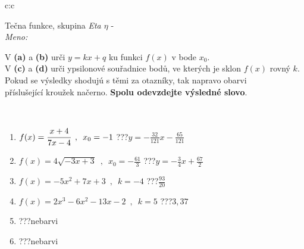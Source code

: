 \documentclass[10pt]{report}
\begin{document}
\newpage
\thispagestyle{empty}
\begin{tabular}{c:c}
\begin{minipage}[c][104.5mm][t]{0.5\linewidth}
\begin{center}
\vspace{7mm}
{\huge Tečna funkce, skupina \textit{Eta $\eta$} -}\\[5mm]
\textit{Meno:}\phantom{xxxxxxxxxxxxxxxxxxxxxxxxxxxxxxxxxxxxxxxxxxxxxxxxxxxxxxxxxxxxxxxxx}\\[5mm]
\begin{minipage}{0.95\linewidth}
\begin{center}
V \textbf{(a)} a \textbf{(b)} urči  $y = kx + q$ ku funkci $f(x)$ v bode $x_0$.\\V \textbf{(c)} a \textbf{(d)} urči ypsilonové souřadnice bodů, ve kterých je sklon $f(x)$ rovný $k$.\\Pokud se výsledky shodujú s těmi za otazníky, tak napravo obarvi\\příslušející kroužek načerno. \textbf{Spolu odevzdejte výsledné slovo}.
\end{center}
\end{minipage}
\\[1mm]
\begin{minipage}{0.79\linewidth}
\begin{center}
\begin{varwidth}{\linewidth}
\begin{enumerate}
\small
\item $f(x)=\cfrac{x+4}{7x-4}\enspace , \enspace x_0=-1$\quad \dotfill\; ???\;\dotfill \quad $y = -\frac{32}{121}x-\frac{65}{121}$
\item $f(x)=4\sqrt{-3x+3}\enspace , \enspace x_0=-\frac{61}{3}$\quad \dotfill\; ???\;\dotfill \quad $y = -\frac{3}{4}x+\frac{67}{2}$
\item $f(x)=-5x^2+7x+3\enspace , \enspace k=-4$\quad \dotfill\; ???\;\dotfill \quad $\frac{93}{20}$
\item $f(x)=2x^3-6x^2-13x-2\enspace , \enspace k=5$\quad \dotfill\; ???\;\dotfill \quad $3 , 37$
\item \quad \dotfill\; ???\;\dotfill \quad nebarvi
\item \quad \dotfill\; ???\;\dotfill \quad nebarvi
\end{enumerate}
\end{varwidth}
\end{center}
\end{minipage}
\begin{minipage}{0.20\linewidth}

\end{minipage}
\end{center}
\end{minipage}
\end{tabular}
\end{document}
